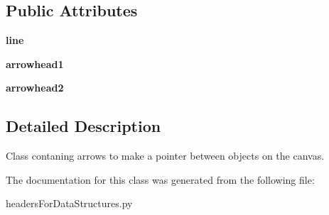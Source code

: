 \subsection*{Public Attributes}
\begin{DoxyCompactItemize}
\item 
\mbox{\label{classheaders_for_data_structures_1_1right_arrow_aee6de10c02c9ea41f85dda3608bc2c29}} 
{\bfseries line}
\item 
\mbox{\label{classheaders_for_data_structures_1_1right_arrow_a8d9040aee6f54367b956a1af7aec6401}} 
{\bfseries arrowhead1}
\item 
\mbox{\label{classheaders_for_data_structures_1_1right_arrow_a057c3637cb94f18827aa4ffa86dd3355}} 
{\bfseries arrowhead2}
\end{DoxyCompactItemize}


\subsection{Detailed Description}
Class contaning arrows to make a pointer between objects on the canvas. 

The documentation for this class was generated from the following file\+:\begin{DoxyCompactItemize}
\item 
headers\+For\+Data\+Structures.\+py\end{DoxyCompactItemize}
